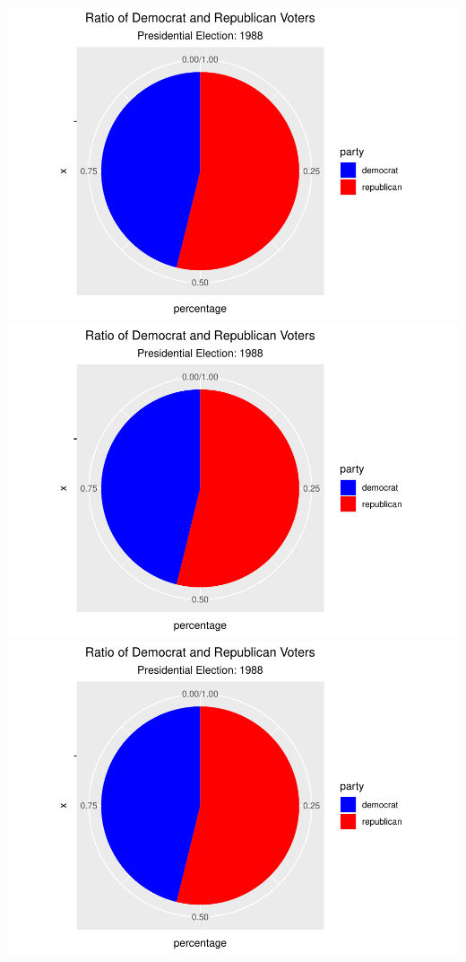 \documentclass[
]{article}
\begin{document}
\includegraphics{election_files/figure-latex/anim-31.pdf}
\includegraphics{election_files/figure-latex/anim-32.pdf}
\includegraphics{election_files/figure-latex/anim-33.pdf}
\end{document}
